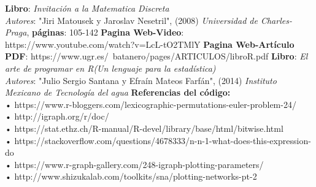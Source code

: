 \documentclass[11pt,a4paper]{article}
\author{Jaafar Farut Sahua Torres}
\begin{document}
\begin{flushleft}  
\begin{thebibliography}{}
 \textbf{Libro}: \textit{Invitaci{\'o}n a la Matematica Discreta} \\ \emph{Autores}: "Jiri Matousek y Jaroslav Nesetril", (2008) \textit{Universidad de Charles-Praga}, \textbf{p{\'a}ginas}: 105-142
 \textbf{Pagina Web-Video}: https://www.youtube.com/watch?v=LcL-tO2TMlY 
 \textbf{Pagina Web-Art{\'i}culo PDF}: https://www.ugr.es/~batanero/pages/ARTICULOS/libroR.pdf 
  \textbf{Libro}: \textit{El arte de programar en R(Un lenguaje para la estad{\'i}stica)} \\ \emph{Autores}: "Julio Sergio Santana y Efra{\'i}n Mateos Farf{\'a}n", (2014) \textit{Instituto Mexicano de Tecnolog{\'i}a del agua} 
 \textbf{Referencias del c{\'o}digo:}\\
• https://www.r-bloggers.com/lexicographic-permutations-euler-problem-24/\\
• http://igraph.org/r/doc/\\
• https://stat.ethz.ch/R-manual/R-devel/library/base/html/bitwise.html\\
• https://stackoverflow.com/questions/4678333/n-n-1-what-does-this-expression-do\\
• https://www.r-graph-gallery.com/248-igraph-plotting-parameters/\\
• http://www.shizukalab.com/toolkits/sna/plotting-networks-pt-2\\
\end{thebibliography} 
\end{flushleft}
\end{document}
